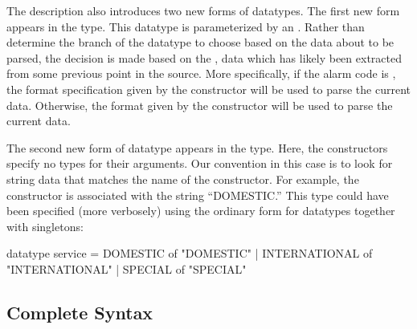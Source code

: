 
The \darkstar{} description also introduces two new forms of
datatypes.  The first new form appears in the  type.
This datatype is parameterized by an .
Rather than 
determine the branch of the datatype to choose
based on the data about to be parsed, the decision is made based on
the , data which has likely been extracted from some previous
point in the source.  More specifically, if the alarm code is
, the format specification given by the 
 constructor will be used to parse
the current data.  Otherwise, the format given by the  constructor
will be used to parse the current data.  

The second new form of datatype appears in the   type.
Here, the constructors specify no types for their arguments.  
Our convention in this case
is to look for string data that matches the name of the
constructor. For example, the constructor  
is associated with the string
``DOMESTIC.'' This type could have been specified (more verbosely)
using the ordinary form for datatypes together with singletons:
\begin{code}
datatype service =
    DOMESTIC      of "DOMESTIC"
  | INTERNATIONAL of "INTERNATIONAL"
  | SPECIAL       of "SPECIAL"
\end{code}


\subsection{Complete Syntax}

